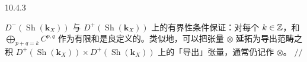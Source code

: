 \begin{wexam}{10.4.3}

$D^-\left(\operatorname{Sh}(\mathbf{k}_X)\right)$ 与
$D^+\left(\operatorname{Sh}(\mathbf{k}_X)\right)$ 上的有界性条件保证：对每个
$k\in\mathbb{Z}$，和 $\bigoplus_{p+q=k}C^{p,q}$ 作为有限和是良定义的。类似地，可以把张量
$\otimes$ 延拓为导出范畴之积
$D^+(\operatorname{Sh}(\mathbf{k}_X))\times
D^+(\operatorname{Sh}(\mathbf{k}_X))$ 上的「导出」张量，通常仍记作 $\otimes$。
\hfill$//$
\end{wexam}

